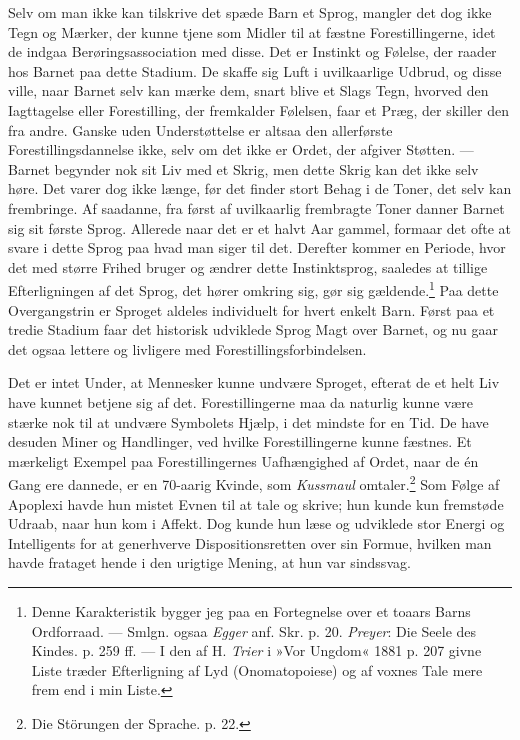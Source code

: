 \documentclass[12pt,a4paper,openany]{book}
\newcommand{\opage}[1]{\marginnote{\footnotesize\textit{[#1]}}}
\begin{document}
Selv om man ikke kan tilskrive det spæde Barn et Sprog, mangler det dog
ikke Tegn og Mærker, der kunne tjene som Midler til at fæstne
Forestillingerne, idet de indgaa Berøringsassociation med disse. Det er
Instinkt og Følelse, der raader hos Barnet paa dette Stadium. De skaffe
sig Luft i uvilkaarlige Udbrud, og disse ville, naar Barnet selv kan
mærke dem, snart blive et Slags Tegn, hvorved den Iagttagelse eller
Forestilling, der fremkalder Følelsen, faar et Præg, der skiller den fra
andre. Ganske uden Understøttelse er altsaa den allerførste
Forestillingsdannelse ikke, selv om det ikke er Ordet, der afgiver
Støtten. --- Barnet begynder nok sit Liv med et Skrig, men dette Skrig
kan det ikke selv høre. Det varer dog ikke længe, før det finder stort
Behag i de Toner, det selv kan frembringe. Af saadanne, fra først af
uvilkaarlig frembragte Toner danner Barnet sig sit første Sprog.
Allerede naar det er et halvt Aar gammel, formaar det ofte at svare i
dette Sprog paa hvad man siger til det. Derefter kommer en Periode, hvor
det med større Frihed bruger og ændrer dette Instinktsprog, saaledes at
tillige Efterligningen af det Sprog, det hører omkring sig, gør sig
gældende.\footnote[1]{Denne Karakteristik bygger jeg paa en Fortegnelse
over et toaars Barns Ordforraad. --- Smlgn. ogsaa \emph{Egger} anf. Skr.
p. 20. \emph{Preyer}: Die Seele des Kindes. p. 259 ff. --- I den af H.
\emph{Trier} i »Vor Ungdom« 1881 p. 207 givne Liste træder Efterligning
af Lyd (Onomatopoiese) og af voxnes Tale mere frem end i min Liste.} Paa
dette Overgangstrin er Sproget aldeles individuelt for hvert enkelt
Barn. Først paa et tredie Stadium faar det historisk udviklede Sprog
Magt
\opage{207}over Barnet, og nu gaar det ogsaa lettere og livligere med
Forestillingsforbindelsen.

Det er intet Under, at Mennesker kunne undvære Sproget, efterat de et
helt Liv have kunnet betjene sig af det. Forestillingerne maa da
naturlig kunne være stærke nok til at undvære Symbolets Hjælp, i det
mindste for en Tid. De have desuden Miner og Handlinger, ved hvilke
Forestillingerne kunne fæstnes. Et mærkeligt Exempel paa
Forestillingernes Uafhængighed af Ordet, naar de én Gang ere dannede, er
en 70-aarig Kvinde, som \emph{Kussmaul} omtaler.\footnote[1]{Die
Störungen der Sprache. p. 22.} Som Følge af Apoplexi havde hun mistet
Evnen til at tale og skrive; hun kunde kun fremstøde Udraab, naar hun
kom i Affekt. Dog kunde hun læse og udviklede stor Energi og
Intelligents for at generhverve Dispositionsretten over sin Formue,
hvilken man havde frataget hende i den urigtige Mening, at hun var
sindssvag.
\end{document}
